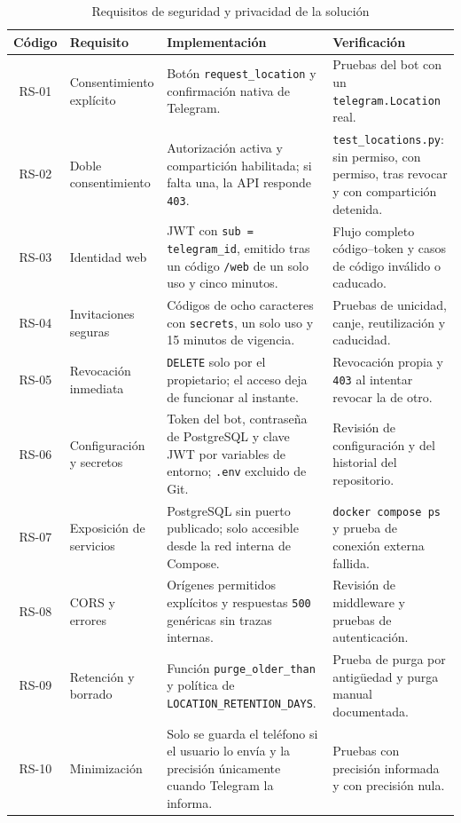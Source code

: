 \begin{table}[H]
	\caption{Requisitos de seguridad y privacidad de la solución}
	\label{tab:requisitos-seguridad}
	\centering
	\footnotesize
	\setlength{\tabcolsep}{3pt}
	\renewcommand{\arraystretch}{1.2}
	\begin{tabularx}{\textwidth}{@{}c >{\raggedright\arraybackslash}p{} Y >{\raggedright\arraybackslash}p{0.22\textwidth}@{}}
		\toprule
		\textbf{Código} & \textbf{Requisito} & \textbf{Implementación} & \textbf{Verificación} \\
		\midrule
		RS-01 & Consentimiento explícito & Botón \texttt{request\_location} y confirmación nativa de Telegram. & Pruebas del bot con un \texttt{telegram.Location} real. \\
		RS-02 & Doble consentimiento & Autorización activa y compartición habilitada; si falta una, la API responde \texttt{403}. & \texttt{test\_locations.py}: sin permiso, con permiso, tras revocar y con compartición detenida. \\
		RS-03 & Identidad web & JWT con \texttt{sub = telegram\_id}, emitido tras un código \texttt{/web} de un solo uso y cinco minutos. & Flujo completo código--token y casos de código inválido o caducado. \\
		RS-04 & Invitaciones seguras & Códigos de ocho caracteres con \texttt{secrets}, un solo uso y 15 minutos de vigencia. & Pruebas de unicidad, canje, reutilización y caducidad. \\
		RS-05 & Revocación inmediata & \texttt{DELETE} solo por el propietario; el acceso deja de funcionar al instante. & Revocación propia y \texttt{403} al intentar revocar la de otro. \\
		RS-06 & Configuración y secretos & Token del bot, contraseña de PostgreSQL y clave JWT por variables de entorno; \texttt{.env} excluido de Git. & Revisión de configuración y del historial del repositorio. \\
		RS-07 & Exposición de servicios & PostgreSQL sin puerto publicado; solo accesible desde la red interna de Compose. & \texttt{docker compose ps} y prueba de conexión externa fallida. \\
		RS-08 & CORS y errores & Orígenes permitidos explícitos y respuestas \texttt{500} genéricas sin trazas internas. & Revisión de middleware y pruebas de autenticación. \\
		RS-09 & Retención y borrado & Función \texttt{purge\_older\_than} y política de \texttt{LOCATION\_RETENTION\_DAYS}. & Prueba de purga por antigüedad y purga manual documentada. \\
		RS-10 & Minimización & Solo se guarda el teléfono si el usuario lo envía y la precisión únicamente cuando Telegram la informa. & Pruebas con precisión informada y con precisión nula. \\
		\bottomrule
	\end{tabularx}
\end{table}
